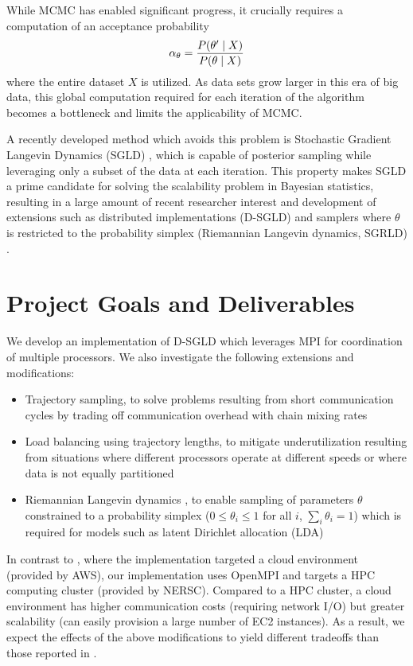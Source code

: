 \documentclass{article}
\begin{document}
While MCMC has enabled significant progress, it crucially requires a computation of an
acceptance probability
\begin{align}
  \alpha_\theta = {P(\theta' \mid X) \over P(\theta \mid X)}
\end{align}
where the entire dataset $X$ is utilized. As data sets grow larger in this era of big data,
this global computation required for each iteration of the algorithm
becomes a bottleneck and limits the applicability of MCMC.

A recently developed method which avoids this problem is Stochastic Gradient Langevin Dynamics (SGLD)
\citep{welling2011bayesian}, which is capable of posterior sampling while leveraging only a subset
of the data at each iteration. This property makes SGLD a prime candidate for solving
the scalability problem in Bayesian statistics, resulting in a large amount of recent researcher
interest and development of extensions such as distributed implementations (D-SGLD) \citep{ahn2014distributed}
and samplers where $\theta$ is restricted to the probability simplex
(Riemannian Langevin dynamics, SGRLD) \citep{patterson2013stochastic}.

\section{Project Goals and Deliverables}

We develop an implementation of D-SGLD which leverages MPI for coordination of multiple processors.
We also investigate the following extensions and modifications:
\begin{itemize}
  \item Trajectory sampling, to solve problems resulting from short communication cycles by
    trading off communication overhead with chain mixing rates
  \item Load balancing using trajectory lengths, to mitigate underutilization
    resulting from situations where different processors operate at different
    speeds or where data is not equally partitioned
  \item Riemannian Langevin dynamics \citep{patterson2013stochastic}, to enable sampling of
    parameters $\theta$ constrained to a probability simplex
    ($0 \leq \theta_i \leq 1$ for all $i$, $\sum_i \theta_i = 1$)
    which is required for models such as latent Dirichlet allocation (LDA) \citep{blei2003latent}
\end{itemize}

In contrast to \citet{ahn2014distributed}, where the implementation targeted a
cloud environment (provided by AWS), our implementation uses OpenMPI and
targets a HPC computing cluster (provided by NERSC). Compared to a HPC cluster,
a cloud environment has higher communication costs (requiring network I/O) but
greater scalability (can easily provision a large number of EC2 instances). As
a result, we expect the effects of the above modifications to yield
different tradeoffs than those reported in \citet{ahn2014distributed}.
\end{document}

